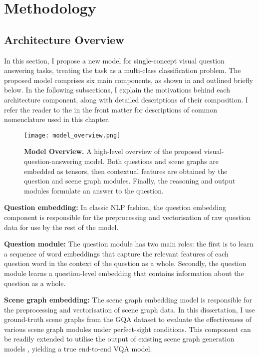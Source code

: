 \chapter{Methodology}
\label{chapter:methodology}

\section{Architecture Overview}
\label{section:architecture_overview}

In this section, I propose a new model for single-concept visual question answering tasks, treating the task as a multi-class classification problem. The proposed model comprises six main components, as shown in \figureautorefname{ \ref{fig:model_overview}} and outlined briefly below. In the following subsections, I explain the motivations behind each architecture component, along with detailed descriptions of their composition. I refer the reader to the  in the front matter for descriptions of common nomenclature used in this chapter.


\begin{figure}[htbp]
    \centering
    \texttt{[image: model\_overview.png]}
    \caption[An overview of the proposed visual-question-answering model.]{\textbf{Model Overview.} A high-level overview of the proposed visual-question-answering model. Both questions and scene graphs are embedded as tensors, then contextual features are obtained by the question and scene graph modules. Finally, the reasoning and output modules formulate an answer to the question.}
    \label{fig:model_overview}
\end{figure}

\textbf{Question embedding:} In classic NLP fashion, the question embedding component is responsible for the preprocessing and vectorisation of raw question data for use by the rest of the model.

\textbf{Question module:} The question module has two main roles: the first is to learn a sequence of word embeddings that capture the relevant features of each question word in the context of the question as a whole. Secondly, the question module learns a question-level embedding that contains information about the question as a whole.

\textbf{Scene graph embedding:} The scene graph embedding model is responsible for the preprocessing and vectorisation of scene graph data. In this dissertation, I use ground-truth scene graphs from the GQA dataset to evaluate the effectiveness of various scene graph modules under perfect-sight conditions. This component can be readily extended to utilise the output of existing scene graph generation models \cite{yang2018graph, li2019relation}, yielding a true end-to-end VQA model.

